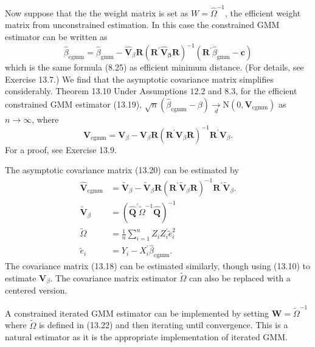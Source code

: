 \documentclass[10pt]{article}
\begin{document}
Now suppose that the the weight matrix is set as $W=\widehat{\Omega}^{-1}$, the efficient weight matrix from unconstrained estimation. In this case the constrained GMM estimator can be written as
$$
\widehat{\beta}_{\mathrm{cgmm}}=\widehat{\beta}_{\mathrm{gmm}}-\widehat{\boldsymbol{V}}_{\beta} \boldsymbol{R}\left(\boldsymbol{R}^{\prime} \widehat{\boldsymbol{V}}_{\boldsymbol{\beta}} \boldsymbol{R}\right)^{-1}\left(\boldsymbol{R}^{\prime} \widehat{\beta}_{\mathrm{gmm}}-\boldsymbol{c}\right)
$$
which is the same formula (8.25) as efficient minimum distance. (For details, see Exercise 13.7.) We find that the asymptotic covariance matrix simplifies considerably. Theorem 13.10 Under Assumptions $12.2$ and 8.3, for the efficient constrained GMM estimator (13.19), $\sqrt{n}\left(\widehat{\beta}_{\mathrm{cgmm}}-\beta\right) \underset{d}{\longrightarrow} \mathrm{N}\left(0, \boldsymbol{V}_{\mathrm{cgmm}}\right)$ as $n \rightarrow \infty$, where
$$
\boldsymbol{V}_{\mathrm{cgmm}}=\boldsymbol{V}_{\beta}-\boldsymbol{V}_{\beta} \boldsymbol{R}\left(\boldsymbol{R}^{\prime} \boldsymbol{V}_{\beta} \boldsymbol{R}\right)^{-1} \boldsymbol{R}^{\prime} \boldsymbol{V}_{\beta} .
$$
For a proof, see Exercise 13.9.

The asymptotic covariance matrix (13.20) can be estimated by
$$
\begin{aligned}
\widehat{\boldsymbol{V}}_{\mathrm{cgmm}} &=\widetilde{\boldsymbol{V}}_{\beta}-\widetilde{\boldsymbol{V}}_{\beta} \boldsymbol{R}\left(\boldsymbol{R}^{\prime} \widetilde{\boldsymbol{V}}_{\beta} \boldsymbol{R}\right)^{-1} \boldsymbol{R}^{\prime} \widetilde{\boldsymbol{V}}_{\beta} . \\
\widetilde{\boldsymbol{V}}_{\beta} &=\left(\widehat{\boldsymbol{Q}}^{\prime} \widetilde{\Omega}^{-1} \widehat{\boldsymbol{Q}}\right)^{-1} \\
\widetilde{\Omega} &=\frac{1}{n} \sum_{i=1}^{n} Z_{i} Z_{i}^{\prime} \widetilde{e}_{i}^{2} \\
\widetilde{e}_{i} &=Y_{i}-X_{i}^{\prime} \widehat{\beta}_{\mathrm{cgmm}} .
\end{aligned}
$$
The covariance matrix (13.18) can be estimated similarly, though using (13.10) to estimate $\boldsymbol{V}_{\beta}$. The covariance matrix estimator $\widetilde{\Omega}$ can also be replaced with a centered version.

A constrained iterated GMM estimator can be implemented by setting $\boldsymbol{W}=\widetilde{\Omega}^{-1}$ where $\widetilde{\Omega}$ is defined in (13.22) and then iterating until convergence. This is a natural estimator as it is the appropriate implementation of iterated GMM.
\end{document}
